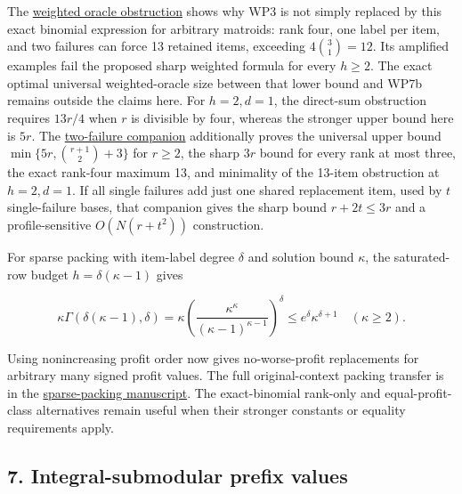 The \href{https://github.com/icekylinx/algorithm-frontier/blob/main/problems/matroid-failure-summaries/manuscripts/weighted-oracle-two-failure-obstruction.md}{weighted oracle obstruction} shows why WP3 is not simply replaced by this exact binomial expression for arbitrary matroids: rank four, one label per item, and two failures can force 13 retained items, exceeding \(4\binom{3}{1}=12\). Its amplified examples fail the proposed sharp weighted formula for every \(h\ge2\). The exact optimal universal weighted-oracle size between that lower bound and WP7b remains outside the claims here. For \(h=2,d=1\), the direct-sum obstruction requires \(13r/4\) when \(r\) is divisible by four, whereas the stronger upper bound here is \(5r\). The \href{https://github.com/icekylinx/algorithm-frontier/blob/main/problems/matroid-failure-summaries/manuscripts/two-failure-oracle-prefix-bounds.md}{two-failure companion} additionally proves the universal upper bound \(\min\{5r,\binom{r+1}{2}+3\}\) for \(r\ge2\), the sharp \(3r\) bound for every rank at most three, the exact rank-four maximum 13, and minimality of the 13-item obstruction at \(h=2,d=1\). If all single failures add just one shared replacement item, used by \(t\) single-failure bases, that companion gives the sharp bound \(r+2t\le3r\) and a profile-sensitive \(O(N(r+t^2))\) construction.

For sparse packing with item-label degree \(\delta\) and solution bound \(\kappa\), the saturated-row budget \(h=\delta(\kappa-1)\) gives

\[
\kappa\Gamma(\delta(\kappa-1),\delta)
 =\kappa\left(
 \frac{\kappa^\kappa}{(\kappa-1)^{\kappa-1}}
 \right)^\delta
 \le e^\delta\kappa^{\delta+1}
\quad (\kappa\ge2).
\tag{WP9}
\]

Using nonincreasing profit order now gives no-worse-profit replacements for arbitrary many signed profit values. The full original-context packing transfer is in the \href{https://github.com/icekylinx/algorithm-frontier/blob/main/problems/weighted-prefix-quota-frontier/manuscripts/sharp-sparse-packing-fpt-restrictions.md}{sparse-packing manuscript}. The exact-binomial rank-only and equal-profit-class alternatives remain useful when their stronger constants or equality requirements apply.

\hypertarget{af-eb38c0014f-integral-submodular-prefix-values}{%
\subsection{7. Integral-submodular prefix values}\label{af-eb38c0014f-integral-submodular-prefix-values}}

